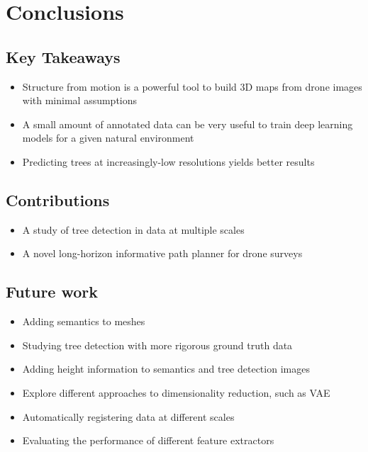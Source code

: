 
\chapter{Conclusions} \label{chapConclusions}
\section{Key Takeaways}
\begin{itemize}
    \item Structure from motion is a powerful tool to build 3D maps from drone images with minimal assumptions
    \item A small amount of annotated data can be very useful to train deep learning models for a given natural environment
    \item Predicting trees at increasingly-low resolutions yields better results 
\end{itemize}
\section{Contributions}
\begin{itemize}
    \item A study of tree detection in data at multiple scales 
    \item A novel long-horizon informative path planner for drone surveys
\end{itemize}
\section{Future work}
\begin{itemize}
    \item Adding semantics to meshes 
    \item Studying tree detection with more rigorous ground truth data
    \item Adding height information to semantics and tree detection images
    \item Explore different approaches to dimensionality reduction, such as VAE
    \item Automatically registering data at different scales
    \item Evaluating the performance of different feature extractors
\end{itemize}


